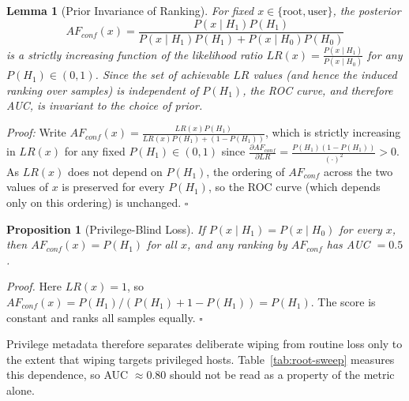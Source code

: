 \documentclass[12pt]{article}
\newtheorem{lemma}{Lemma}
\newtheorem{proposition}{Proposition}
\begin{document}
\begin{lemma}[Prior Invariance of Ranking]\label{lemma:prior-invariance}
For fixed $x \in \{\text{root}, \text{user}\}$, the posterior 
\[ AF_{conf}(x) = \frac{P(x \mid H_1)P(H_1)}{P(x \mid H_1)P(H_1) + P(x \mid H_0)P(H_0)} \]
is a strictly increasing function of the likelihood ratio $LR(x) = \frac{P(x \mid H_1)}{P(x \mid H_0)}$ for any $P(H_1) \in (0,1)$. Since the set of achievable $LR$ values (and hence the induced ranking over samples) is independent of $P(H_1)$, the ROC curve, and therefore AUC, is invariant to the choice of prior.
\end{lemma}

\textit{Proof:} Write $AF_{conf}(x) = \frac{LR(x)P(H_1)}{LR(x)P(H_1) + (1-P(H_1))}$, which is strictly increasing in $LR(x)$ for any fixed $P(H_1) \in (0,1)$ since $\frac{\partial AF_{conf}}{\partial LR} = \frac{P(H_1)(1-P(H_1))}{(\cdot)^2} > 0$. As $LR(x)$ does not depend on $P(H_1)$, the ordering of $AF_{conf}$ across the two values of $x$ is preserved for every $P(H_1)$, so the ROC curve (which depends only on this ordering) is unchanged. $\square$

\begin{proposition}[Privilege-Blind Loss]\label{prop:blind}
\textit{If $P(x\mid H_1)=P(x\mid H_0)$ for every $x$, then $AF_{conf}(x)=P(H_1)$ for all $x$, and any ranking by $AF_{conf}$ has AUC $=0.5$.}
\end{proposition}

\textit{Proof.} Here $LR(x)=1$, so $AF_{conf}(x)=P(H_1)/(P(H_1)+1-P(H_1))=P(H_1)$. The score is constant and ranks all samples equally. $\square$

Privilege metadata therefore separates deliberate wiping from routine loss only to the extent that wiping targets privileged hosts. Table~\ref{tab:root-sweep} measures this dependence, so AUC $\approx 0.80$ should not be read as a property of the metric alone.
\end{document}
